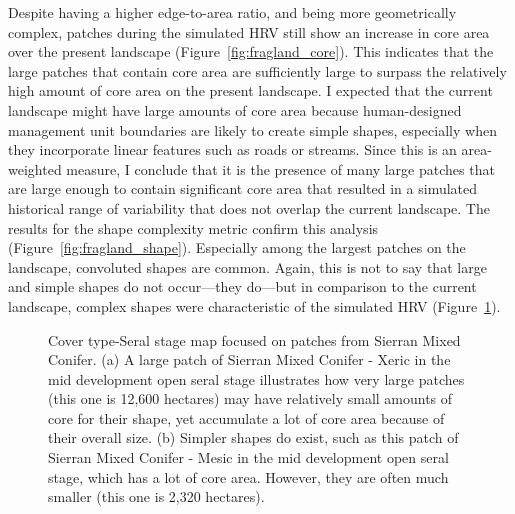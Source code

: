 Despite having a higher edge-to-area ratio, and being more geometrically complex, patches during the simulated HRV still show an increase in core area over the present landscape (Figure~\ref{fig:fragland_core}). This indicates that the large patches that contain core area are sufficiently large to surpass the relatively high amount of core area on the present landscape. I expected that the current landscape might have large amounts of core area because human-designed management unit boundaries are likely to create simple shapes, especially when they incorporate linear features such as roads or streams. Since this is an area-weighted measure, I conclude that it is the presence of many large patches that are large enough to contain significant core area that resulted in a simulated historical range of variability that does not overlap the current landscape. The results for the shape complexity metric confirm this analysis (Figure~\ref{fig:fragland_shape}). Especially among the largest patches on the landscape, convoluted shapes are common. Again, this is not to say that large and simple shapes do not occur---they do---but in comparison to the current landscape, complex shapes were characteristic of the simulated HRV (Figure~\ref{fig:patchmaps4}).

\begin{figure}[!htbp]
  \centering
  \caption{Cover type-Seral stage map focused on patches from Sierran Mixed Conifer. (a) A large patch of Sierran Mixed Conifer - Xeric in the mid development open seral stage illustrates how very large patches (this one is 12,600 hectares) may have relatively small amounts of core for their shape, yet accumulate a lot of core area because of their overall size. (b) Simpler shapes do exist, such as this patch of Sierran Mixed Conifer - Mesic in the mid development open seral stage, which has a lot of core area. However, they are often much smaller (this one is 2,320 hectares).}
  \label{fig:patchmaps4}
\end{figure}

